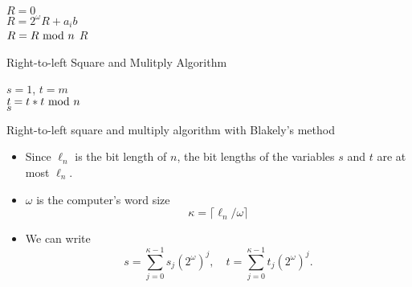 \begin{frame}{}
    \begin{algorithm}[H]
$R=0$\\
 	{
 	$R=2^{\omega}R+a_ib$\\
        $R=R\textrm{~mod~} n$
  	}
  	\Return $R$
	\caption{Blakely's method for computing modular multiplication.}
\end{algorithm}
\end{frame}

\begin{frame}{Right-to-left Square and Mulitply Algorithm}
    \begin{algorithm}[H]
$s= 1$, $t = m$\\
 	{
  		$t=t*t\textrm{~mod~} n$\\
  	}
  	\Return $s$\\
	\caption{Computing RSA signature with the right-to-left square and multiply algorithm.}
\end{algorithm}
\end{frame}

\begin{frame}{Right-to-left square and multiply algorithm with Blakely's method}
    \begin{itemize}
        \item Since $\ell_n$ is the bit length of $n$, the bit lengths of the variables $s$ and $t$ are at most $\ell_n$.
        \item $\omega$ is the computer's word size
        \[
        \kappa=\lceil \ell_n/\omega\rceil
        \]
        \item We can write
\[
s=\sum_{j=0}^{\kappa-1}s_j(2^{\omega})^j,\quad t=\sum_{j=0}^{\kappa-1}t_j(2^{\omega})^j.
\]
    \end{itemize}
\end{frame}


